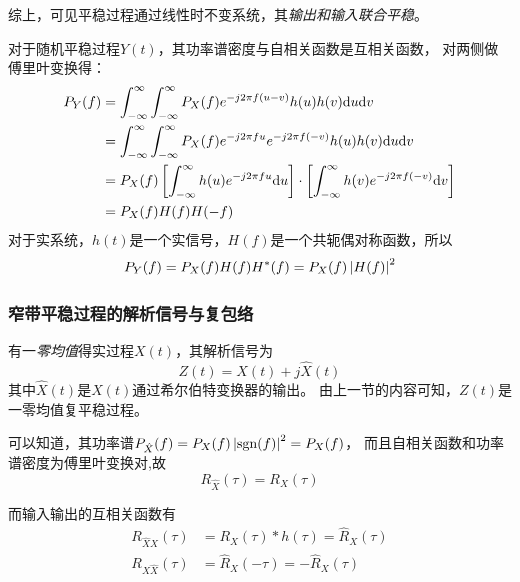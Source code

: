     综上，可见平稳过程通过线性时不变系统，其\emph{输出和输入联合平稳}。

    对于随机平稳过程$Y(t)$，其功率谱密度与自相关函数是互相关函数，
    对两侧做傅里叶变换得：
    \begin{equation}
        \begin{split}
            P_Y(f)  &=\int_{-\infty}^{\infty}\int_{-\infty}^{\infty}P_X(f)e^{-j2\pi f(u-v)}h(u)h(v)\text{\upshape d} u\text{\upshape d} v\\
                    &=\int_{-\infty}^{\infty}\int_{-\infty}^{\infty}P_X(f)e^{-j2\pi f u}e^{-j2\pi f(-v)}h(u)h(v)\text{\upshape d} u\text{\upshape d} v\\
                    &=P_X(f)\left[\int_{-\infty}^{\infty}h(u)e^{-j2\pi f u}\text{\upshape d} u\right]\cdot\left[\int_{-\infty}^{\infty}h(v)e^{-j2\pi f (-v)}\text{\upshape d} v\right]\\
                    &=P_X(f)H(f)H(-f)
        \end{split}
    \end{equation}
    对于实系统，$h(t)$是一个实信号，$H(f)$是一个共轭偶对称函数，所以
    \begin{equation}
        P_Y(f)=P_X(f)H(f)H^*(f)=P_X(f)\left\vert H(f) \right\vert^2
    \end{equation}
    
    \subsubsection{窄带平稳过程的解析信号与复包络}
    有一\emph{零均值}得实过程$X(t)$，其解析信号为
    \begin{equation}
        Z(t)=X(t)+j\hat{X}(t)
    \end{equation}
    其中$\hat{X}(t)$是$X(t)$通过希尔伯特变换器的输出。
    由上一节的内容可知，$Z(t)$是一零均值复平稳过程。

    可以知道，其功率谱$P_{\hat{X}}(f)=P_X(f)\left\vert \text{sgn}(f) \right\vert^2=P_X(f)$，
    而且自相关函数和功率谱密度为傅里叶变换对,故
    \begin{equation}
        R_{\hat{X}}(\tau)=R_X(\tau)
    \end{equation}
    
    而输入输出的互相关函数有
    \begin{align}
        R_{\hat{X}X}(\tau)&=R_X(\tau)*h(\tau)=\hat{R}_X(\tau)\\
        R_{X\hat{X}}(\tau)&=\hat{R}_X(-\tau)=-\hat{R}_X(\tau)
    \end{align}

